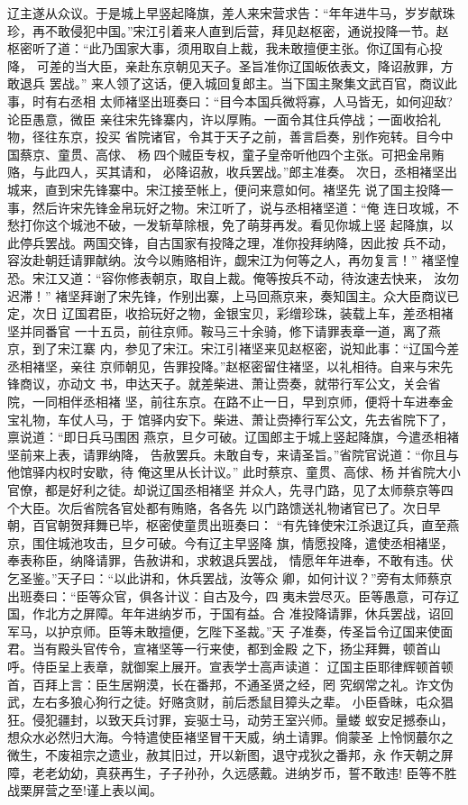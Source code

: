 辽主遂从众议。于是城上早竖起降旗，差人来宋营求告：“年年进牛马，岁岁献珠
珍，再不敢侵犯中国。”宋江引着来人直到后营，拜见赵枢密，通说投降一节。赵
枢密听了道：“此乃国家大事，须用取自上裁，我未敢擅便主张。你辽国有心投降，
可差的当大臣，亲赴东京朝见天子。圣旨准你辽国皈依表文，降诏赦罪，方敢退兵
罢战。”
来人领了这话，便入城回复郎主。当下国主聚集文武百官，商议此事，时有右丞相
太师褚坚出班奏曰：“目今本国兵微将寡，人马皆无，如何迎敌?论臣愚意，微臣
亲往宋先锋寨内，许以厚贿。一面令其住兵停战；一面收拾礼物，径往东京，投买
省院诸官，令其于天子之前，善言启奏，别作宛转。目今中国蔡京、童贯、高俅、
杨四个贼臣专权，童子皇帝听他四个主张。可把金帛贿赂，与此四人，买其请和，
必降诏赦，收兵罢战。”郎主准奏。
次日，丞相褚坚出城来，直到宋先锋寨中。宋江接至帐上，便问来意如何。褚坚先
说了国主投降一事，然后许宋先锋金帛玩好之物。宋江听了，说与丞相褚坚道：“俺
连日攻城，不愁打你这个城池不破，一发斩草除根，免了萌芽再发。看见你城上竖
起降旗，以此停兵罢战。两国交锋，自古国家有投降之理，准你投拜纳降，因此按
兵不动，容汝赴朝廷请罪献纳。汝今以贿赂相许，觑宋江为何等之人，再勿复言！”
褚坚惶恐。宋江又道：“容你修表朝京，取自上裁。俺等按兵不动，待汝速去快来，
汝勿迟滞！”
褚坚拜谢了宋先锋，作别出寨，上马回燕京来，奏知国主。众大臣商议已定，次日
辽国君臣，收拾玩好之物，金银宝贝，彩缯珍珠，装载上车，差丞相褚坚并同番官
一十五员，前往京师。鞍马三十余骑，修下请罪表章一道，离了燕京，到了宋江寨
内，参见了宋江。宋江引褚坚来见赵枢密，说知此事：“辽国今差丞相褚坚，亲往
京师朝见，告罪投降。”赵枢密留住褚坚，以礼相待。自来与宋先锋商议，亦动文
书，申达天子。就差柴进、萧让赍奏，就带行军公文，关会省院，一同相伴丞相褚
坚，前往东京。在路不止一日，早到京师，便将十车进奉金宝礼物，车仗人马，于
馆驿内安下。柴进、萧让赍捧行军公文，先去省院下了，禀说道：“即日兵马围困
燕京，旦夕可破。辽国郎主于城上竖起降旗，今遣丞相褚坚前来上表，请罪纳降，
告赦罢兵。未敢自专，来请圣旨。”省院官说道：“你且与他馆驿内权时安歇，待
俺这里从长计议。”
此时蔡京、童贯、高俅、杨并省院大小官僚，都是好利之徒。却说辽国丞相褚坚
并众人，先寻门路，见了太师蔡京等四个大臣。次后省院各官处都有贿赂，各各先
以门路馈送礼物诸官已了。次日早朝，百官朝贺拜舞已毕，枢密使童贯出班奏曰：
“有先锋使宋江杀退辽兵，直至燕京，围住城池攻击，旦夕可破。今有辽主早竖降
旗，情愿投降，遣使丞相褚坚，奉表称臣，纳降请罪，告赦讲和，求敕退兵罢战，
情愿年年进奉，不敢有违。伏乞圣鉴。”天子曰：“以此讲和，休兵罢战，汝等众
卿，如何计议？”旁有太师蔡京出班奏曰：“臣等众官，俱各计议：自古及今，四
夷未尝尽灭。臣等愚意，可存辽国，作北方之屏障。年年进纳岁币，于国有益。合
准投降请罪，休兵罢战，诏回军马，以护京师。臣等未敢擅便，乞陛下圣裁。”天
子准奏，传圣旨令辽国来使面君。当有殿头官传令，宣褚坚等一行来使，都到金殿
之下，扬尘拜舞，顿首山呼。侍臣呈上表章，就御案上展开。宣表学士高声读道：
辽国主臣耶律辉顿首顿首，百拜上言：臣生居朔漠，长在番邦，不通圣贤之经，罔
究纲常之礼。诈文伪武，左右多狼心狗行之徒。好赂贪财，前后悉鼠目獐头之辈。
小臣昏昧，屯众猖狂。侵犯疆封，以致天兵讨罪，妄驱士马，动劳王室兴师。量蝼
蚁安足撼泰山，想众水必然归大海。今特遣使臣褚坚冒干天威，纳土请罪。倘蒙圣
上怜悯蕞尔之微生，不废祖宗之遗业，赦其旧过，开以新图，退守戎狄之番邦，永
作天朝之屏障，老老幼幼，真获再生，子子孙孙，久远感戴。进纳岁币，誓不敢违!
臣等不胜战栗屏营之至!谨上表以闻。

